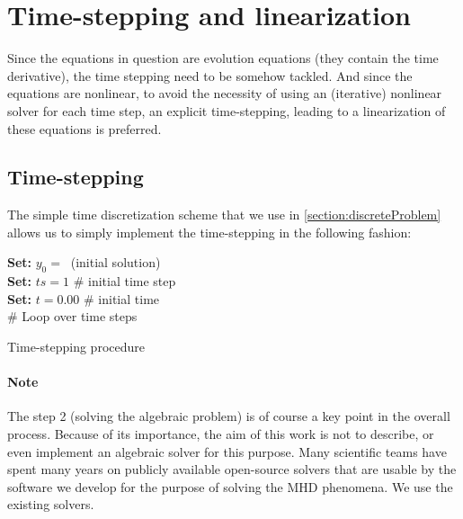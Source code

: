 \section{Time-stepping and linearization}
Since the equations in question are evolution equations (they contain the time derivative), the time stepping need to be somehow tackled. And since the equations are nonlinear, to avoid the necessity of using an (iterative) nonlinear solver for each time step, an explicit time-stepping, leading to a linearization of these equations is preferred.
\subsection{Time-stepping}
The simple time discretization scheme that we use in \cref{section:discreteProblem} allows us to simply implement the time-stepping in the following fashion:\\
\begin{algorithm}[H]
\textbf{    Set: }$y_0 =\ $ (initial solution)\\
\textbf{    Set: }$ts = 1 $ \# initial time step\\
\textbf{    Set: }$t = 0.00 $ \# initial time\\
    \# Loop over time steps\\
    \caption{Time-stepping procedure}
\label{algorithm:timeStepping}
\end{algorithm}
\paragraph{Note}
\label{note:solvers}
The step 2 (solving the algebraic problem) is of course a key point in the overall process. Because of its importance, the aim of this work is not to describe, or even implement an algebraic solver for this purpose. Many scientific teams have spent many years on publicly available open-source solvers that are usable by the software we develop for the purpose of solving the MHD phenomena. We use the existing solvers.